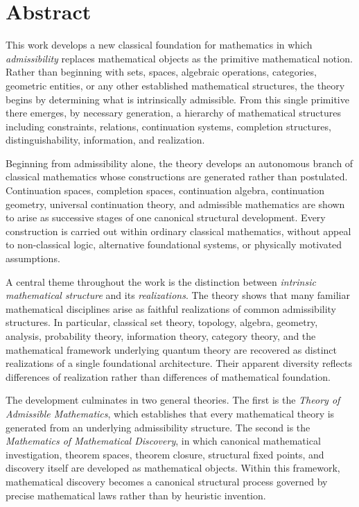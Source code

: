 \documentclass[13pt,openany]{book}
\theoremstyle{plain}
\theoremstyle{definition}
\begin{document}
\chapter*{Abstract}

This work develops a new classical foundation for mathematics in which
\emph{admissibility} replaces mathematical objects as the primitive
mathematical notion. Rather than beginning with sets, spaces, algebraic
operations, categories, geometric entities, or any other established
mathematical structures, the theory begins by determining what is
intrinsically admissible. From this single primitive there emerges, by
necessary generation, a hierarchy of mathematical structures including
constraints, relations, continuation systems, completion structures,
distinguishability, information, and realization.

Beginning from admissibility alone, the theory develops an autonomous branch of
classical mathematics whose constructions are generated rather than postulated.
Continuation spaces, completion spaces, continuation algebra, continuation
geometry, universal continuation theory, and admissible mathematics are shown
to arise as successive stages of one canonical structural development. Every
construction is carried out within ordinary classical mathematics, without
appeal to non-classical logic, alternative foundational systems, or physically
motivated assumptions.

A central theme throughout the work is the distinction between
\emph{intrinsic mathematical structure} and its \emph{realizations}. The theory
shows that many familiar mathematical disciplines arise as faithful
realizations of common admissibility structures. In particular, classical set
theory, topology, algebra, geometry, analysis, probability theory, information
theory, category theory, and the mathematical framework underlying quantum
theory are recovered as distinct realizations of a single foundational
architecture. Their apparent diversity reflects differences of realization
rather than differences of mathematical foundation.

The development culminates in two general theories. The first is the
\emph{Theory of Admissible Mathematics}, which establishes that every
mathematical theory is generated from an underlying admissibility structure.
The second is the \emph{Mathematics of Mathematical Discovery}, in which
canonical mathematical investigation, theorem spaces, theorem closure,
structural fixed points, and discovery itself are developed as mathematical
objects. Within this framework, mathematical discovery becomes a canonical
structural process governed by precise mathematical laws rather than by
heuristic invention.
\end{document}
